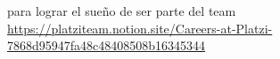 \documentclass{article}
\begin{document}
    para lograr el sueño de ser parte del team\\ 
    \url{https://platziteam.notion.site/Careers-at-Platzi-7868d95947fa48c48408508b16345344}
\end{document}

